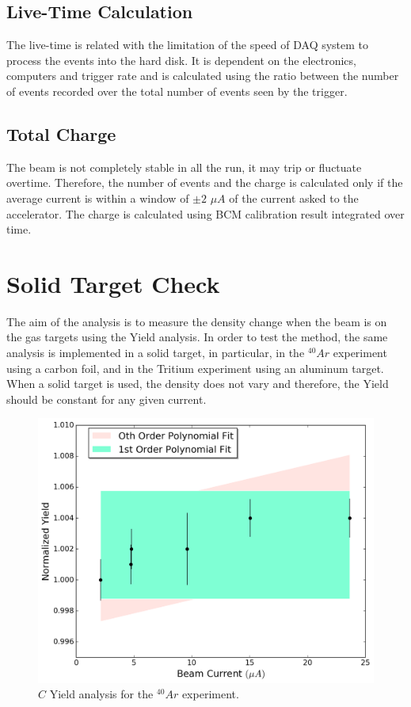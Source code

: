 \documentclass[final,5p,times,twocolumn]{elsarticle}
\begin{document}
\subsection{Live-Time Calculation } 

The live-time is related with the limitation of the speed of DAQ system to process the events into the hard disk. It is dependent on the electronics, computers and trigger rate and is calculated using the ratio between the number of events recorded over the total number of events seen by the trigger. 



\subsection{ Total Charge}

The beam is not completely stable in all the run, it may trip or fluctuate overtime. Therefore, the number of events and the charge is calculated only if the average current is within a window of $\pm 2$ $\mu A$ of the current asked to the accelerator.  The charge is calculated using BCM calibration result integrated over time.


\section{Solid Target Check}

The aim of the analysis is to measure the density change when the beam is on the gas targets using the Yield analysis. In order to test the method, the same analysis is implemented in a solid target, in particular, in the $^{40}Ar$ experiment using a carbon foil, and in the Tritium experiment using an aluminum target. When a solid target is used, the density does not vary and therefore, the Yield should be constant for any given current.

\begin{figure}[htbp]
    \centering
    \includegraphics[width=\linewidth]{images/solid_target.pdf}
    \caption{$C$ Yield analysis for the $^{40}Ar$ experiment.}
    \label{fig:solid}
\end{figure}
\end{document}
